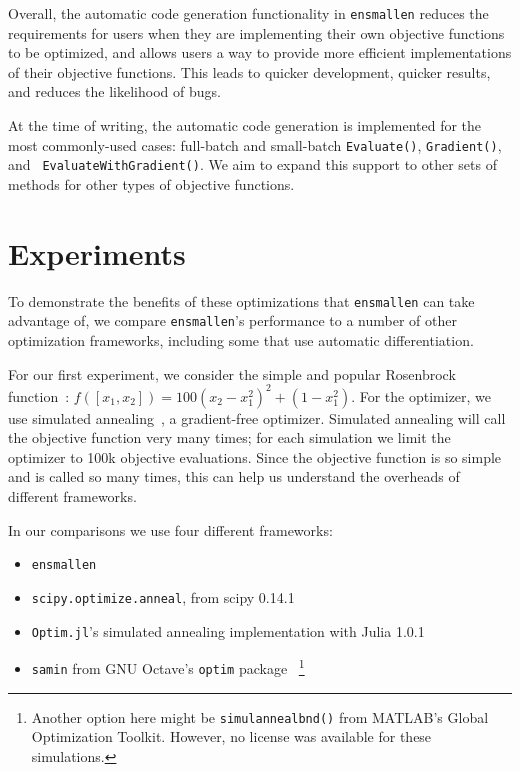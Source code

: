 \documentclass{article}
\begin{document}
Overall, the automatic code generation functionality in {\tt ensmallen}
reduces the requirements for users
when they are implementing their own objective functions to be optimized,
and allows users a way to provide more efficient implementations of their
objective functions.
This leads to quicker development, quicker results, and reduces the likelihood of bugs.

At the time of writing, the automatic code generation
is implemented for the most commonly-used cases:
full-batch and small-batch {\tt Evaluate()}, {\tt Gradient()}, and {\tt
EvaluateWithGradient()}.  We aim to expand this support to other
sets of methods for other types of objective functions.


\vspace*{-0.3em}
\section{Experiments}
\vspace*{-0.5em}

To demonstrate the benefits of these optimizations that {\tt ensmallen} can take
advantage of, we compare {\tt ensmallen}'s performance to a number of other
optimization frameworks, including some that use automatic differentiation.

For our first experiment, we consider the simple and popular Rosenbrock
function~\cite{Rosenbrock1960}: $f([x_1, x_2]) = 100 (x_2 - x_1^2)^2 + (1 -
x_1^2)$.  For the optimizer, we use simulated
annealing~\cite{kirkpatrick1983optimization}, a gradient-free optimizer.
Simulated annealing will call the objective function very many times; for each
simulation we limit the optimizer to 100k objective evaluations.  Since the
objective function is so simple and is called so many times, this can help us
understand the overheads of different frameworks.

In our comparisons we use four different frameworks:

\vspace*{-0.3em}
\begin{itemize} \itemsep -1pt
  \item {\tt ensmallen}
  \item {\tt scipy.optimize.anneal}, from scipy 0.14.1~\cite{jones2014scipy}
  \item {\tt Optim.jl}'s simulated annealing implementation with Julia
1.0.1~\cite{mogensen2018optim}
  \item {\tt samin} from GNU Octave's {\tt optim} package~\cite{octave}
\footnote{Another option here might be {\tt simulannealbnd()} from MATLAB's
Global Optimization Toolkit.  However, no license was available for these
simulations.}
\end{itemize}
\vspace*{-0.3em}
\end{document}
